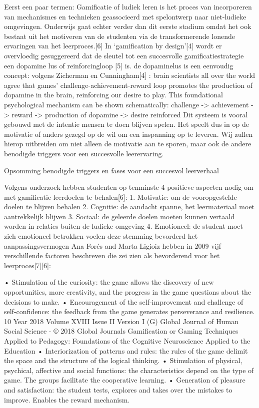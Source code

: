 \documentclass{hogent-article}
\begin{document}
Eerst een paar termen:
Gamificatie of ludiek leren is het proces van incorporeren van mechanismes en technieken geassocieerd met spelontwerp naar niet-ludieke omgevingen. Onderwijs gaat echter verder dan dit eerste stadium omdat het ook bestaat uit het motiveren van de studenten via de transformerende lonende ervaringen van het leerproces.[6]
In ‘gamification by design’[4] wordt er overvloedig gesuggereerd dat de sleutel tot een succesvolle gamificatiestrategie een dopamine lus of reinforcingloop [5] is. de dopaminelus is een eenvoudig concept: volgens Zicherman en Cunningham[4] :
brain scientists all over the world agree that games’ challenge-achievement-reward loop promotes the production of dopamine in the brain, reinforcing our desire to play. This foundational psychological mechanism can be shown schematically: 
challenge -> achievement -> reward -> production of dopamine -> desire reinforced
Dit systeem is vooral gebouwd met de intentie mensen te doen blijven spelen. Het speelt dus in op de motivatie of anders gezegd op de wil om een inspanning op te leveren. Wij zullen hierop uitbreiden om niet alleen de motivatie aan te sporen, maar ook de andere benodigde triggers voor een succesvolle leerervaring.

Opsomming benodigde triggers en fases voor een succesvol leerverhaal

Volgens onderzoek hebben studenten op tenminste 4 positieve aspecten nodig om met gamificatie leerdoelen te behalen[6]:
    1.	Motivatie: om de vooropgestelde doelen te blijven behalen
    2.	Cognitie: de aandacht spanne, het leermateriaal moet aantrekkelijk blijven 
    3.	Sociaal: de geleerde doelen moeten kunnen vertaald worden in relaties buiten de ludieke omgeving
    4.	Emotioneel: de student moet zich emotioneel betrokken voelen deze stemming bevorderd  het aanpassingsvermogen
Ana Forés and Marta Ligioiz hebben in 2009 vijf verschillende factoren beschreven die zei zien als bevorderend voor het leerproces[7][6]:

    •	Stimulation of the curiosity: the game allows the discovery of new opportunities, more creativity, and the progress in the game questions about the decisions to make. 
    •	Encouragement of the self-improvement and challenge of self-confidence: the feedback from the game generates perseverance and resilience. 10 Year 2018 Volume XVIII Issue II Version I (G) Global Journal of Human Social Science - © 2018 Global Journals Gamification or Gaming Techniques Applied to Pedagogy: Foundations of the Cognitive Neuroscience Applied to the Education 
    •	Interiorization of patterns and rules: the rules of the game delimit the space and the structure of the logical thinking. 
    •	Stimulation of physical, psychical, affective and social functions: the characteristics depend on the type of game. The groups facilitate the cooperative learning. 
    •	Generation of pleasure and satisfaction: the student tests, explores and takes over the mistakes to improve. Enables the reward mechanism.
\end{document}
